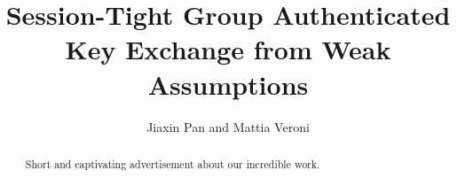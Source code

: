 \documentclass[runningheads,envcountsame]{llncs}
\begin{document}
	
	\title{Session-Tight Group Authenticated Key Exchange from Weak Assumptions}
	
	
	
	
	\author{Jiaxin Pan
		and Mattia Veroni}
	
	
	\maketitle           
	
	\raggedbottom
	\begin{abstract}
		Short and captivating advertisement about our incredible work.      
		
	\end{abstract}
	
	\setlength{\tabcolsep}{3pt}
	\renewcommand{\arraystretch}{1.15}
	
	
	
	
	
	
	
	
	
	
\end{document}
